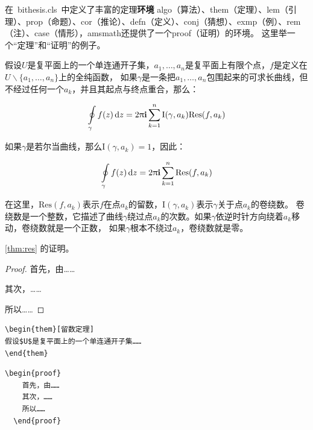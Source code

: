 在~bithesis.cls~中定义了丰富的定理\textbf{环境}
algo（算法）、them（定理）、lem（引理）、prop（命题）、cor（推论）、defn（定义）、conj（猜想）、exmp（例）、rem（注）、case（情形），amsmath还提供了一个proof（证明）的环境。
这里举一个“定理”和“证明”的例子。
\begin{them}[留数定理]
\label{thm:res}
  假设$U$是复平面上的一个单连通开子集，$a_1,\ldots,a_n$是复平面上有限个点，$f$是定义在$U\backslash \{a_1,\ldots,a_n\}$上的全纯函数，
  如果$\gamma$是一条把$a_1,\ldots,a_n$包围起来的可求长曲线，但不经过任何一个$a_k$，并且其起点与终点重合，那么：

  \begin{equation}
    \label{eq:res}
    \ointop_{\gamma}f(z)\,\mathrm{d}z = 2\uppi\mathbf{i}\sum^n_{k=1}\mathrm{I}(\gamma,a_k)\mathrm{Res}(f,a_k)
  \end{equation}

  如果$\gamma$是若尔当曲线，那么$\mathrm{I}(\gamma, a_k)=1$，因此：

  \begin{equation}
    \label{eq:resthm}
    \ointop_{\gamma}f(z)\,\mathrm{d}z = 2\uppi\mathbf{i}\sum^n_{k=1}\mathrm{Res}(f,a_k)
  \end{equation}

  在这里，$\mathrm{Res}(f, a_k)$表示$f$在点$a_k$的留数，$\mathrm{I}(\gamma,a_k)$表示$\gamma$关于点$a_k$的卷绕数。
  卷绕数是一个整数，它描述了曲线$\gamma$绕过点$a_k$的次数。如果$\gamma$依逆时针方向绕着$a_k$移动，卷绕数就是一个正数，
  如果$\gamma$根本不绕过$a_k$，卷绕数就是零。

  \cref{thm:res} 的证明。

  \begin{proof}
    首先，由……

    其次，……

    所以……
  \end{proof}

\end{them}

\begin{lstlisting}[language={[LaTeX]TeX}, caption={定理环境}]
\begin{them}[留数定理]
假设$U$是复平面上的一个单连通开子集……
\end{them}
\end{lstlisting}

\begin{lstlisting}[language={[LaTeX]TeX}, caption={证明环境}]
  \begin{proof}
    首先，由……
    其次，……
    所以……
  \end{proof}
\end{lstlisting}


